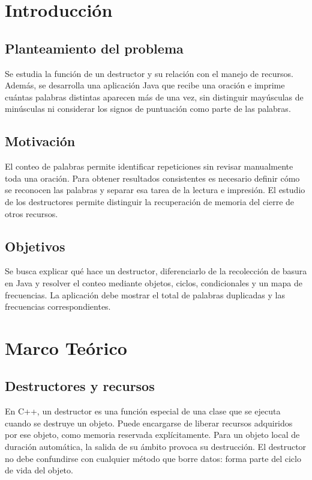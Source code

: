 \documentclass[letterpaper,12pt,oneside]{article}
\numberwithin{figure}{section}
\begin{document}

\tableofcontents
\clearpage
\section{Introducción}
\subsection{Planteamiento del problema}
Se estudia la función de un destructor y su relación con el manejo de recursos. Además, se desarrolla una aplicación Java que recibe una oración e imprime cuántas palabras distintas aparecen más de una vez, sin distinguir mayúsculas de minúsculas ni considerar los signos de puntuación como parte de las palabras.
\subsection{Motivación}
El conteo de palabras permite identificar repeticiones sin revisar manualmente toda una oración. Para obtener resultados consistentes es necesario definir cómo se reconocen las palabras y separar esa tarea de la lectura e impresión. El estudio de los destructores permite distinguir la recuperación de memoria del cierre de otros recursos.
\subsection{Objetivos}
Se busca explicar qué hace un destructor, diferenciarlo de la recolección de basura en Java y resolver el conteo mediante objetos, ciclos, condicionales y un mapa de frecuencias. La aplicación debe mostrar el total de palabras duplicadas y las frecuencias correspondientes.

\section{Marco Teórico}
\subsection{Destructores y recursos}
En C++, un destructor es una función especial de una clase que se ejecuta cuando se destruye un objeto. Puede encargarse de liberar recursos adquiridos por ese objeto, como memoria reservada explícitamente. Para un objeto local de duración automática, la salida de su ámbito provoca su destrucción. El destructor no debe confundirse con cualquier método que borre datos: forma parte del ciclo de vida del objeto.\cite{destructor}
\end{document}
